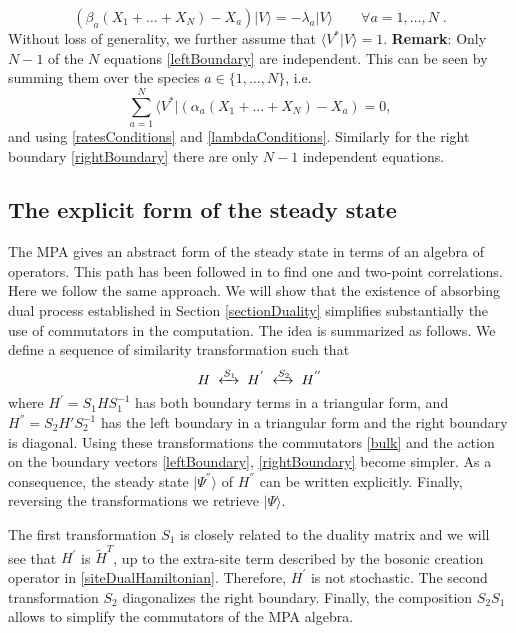 \documentclass[10pt]{article}
\numberwithin{equation}{section}
\numberwithin{equation}{subsection}
\newcommand{\dt}{\;.}
\begin{document}
\begin{equation}\label{rightBoundary}
	\left(\beta_{a}(X_{1}+\ldots+X_{N})-X_{a}\right)|V\rangle=-\lambda_{a}|V\rangle\qquad\forall a=1,\ldots,N\dt
\end{equation}
Without loss of generality, we further assume that $\langle V^{*}|V\rangle=1$. 
\newline \newline
\textbf{Remark}: Only $N-1$ of the $N$ equations \eqref{leftBoundary}  are independent. This can be seen by summing them over the species $a\in \{1,\ldots,N\}$, i.e.
	\begin{equation}
		\sum_{a=1}^{N}	\langle V^{*}|\left(\alpha_{a}(X_{1}+\ldots+X_{N})-X_{a}\right)=0,%
	\end{equation}
	and using  \eqref{ratesConditions} and \eqref{lambdaConditions}.
 Similarly for the right boundary  \eqref{rightBoundary} there are only  $N-1$ independent equations.
\subsection{The explicit form of the steady state}\label{subsection-exact}
The MPA gives an abstract form of the steady state in terms of an algebra of operators. This path has been followed in \cite{vanicat2017exact} to find one and two-point correlations. 
Here we follow the same approach. We will show that the existence of absorbing dual process established in Section \ref{sectionDuality} simplifies substantially the  use of commutators in the
computation. The idea is summarized as follows. We define a sequence of similarity transformation such that 
\begin{equation}
	H\;\xleftrightarrow{S_{1}}\;H^{'}\;\xleftrightarrow{S_{2}}\;H^{''}
\end{equation} 
where $H^{'}= S_{1} H S_{1}^{-1} $ has both boundary terms in a triangular form, and $H^{''} = S_{2}H' S_{2}^{-1}$ has the left boundary in a triangular form and the right boundary is diagonal. Using these transformations the commutators \eqref{bulk} and the action on the boundary vectors \eqref{leftBoundary}, \eqref{rightBoundary} become simpler. As a consequence, the steady state $|\Psi^{''}\rangle$ of $H^{''}$ can be written explicitly. Finally, reversing the transformations we retrieve $|\Psi\rangle$.

The first transformation $S_{1}$ is closely related to the duality matrix and we will see that $H^{'}$ is $\widetilde{H}^{T}$, up to the extra-site term described by the bosonic creation operator in \eqref{siteDualHamiltonian}. Therefore, $H^{'}$ is not stochastic. The second transformation $S_{2}$ diagonalizes the right boundary. Finally, the composition  $S_{2} S_{1}$ allows to simplify the commutators of the MPA algebra. \\
\end{document}
